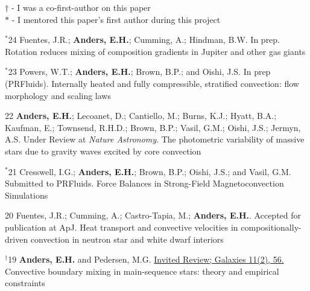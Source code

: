 {}
\hspace{\smallsephintwidth}$\dagger$ - I was a co-first-author on this paper \\
\hspace{\smallsephintwidth}$*$ - I mentored this paper's first author during this project
\vspace{0.3cm}



      {$^*$24}
      { Fuentes, J.R.; \textbf{Anders, E.H.}; Cumming, A.; Hindman, B.W. In prep.
      }
      {Rotation reduces mixing of composition gradients in Jupiter and other gas giants}

\cvpub{}
      {$^*$23}
      {
        Powers, W.T.; \textbf{Anders, E.H.}; Brown, B.P.; and Oishi, J.S.
        In prep (PRFluids).\hspace{-0.5cm}
      }
      {Internally heated and fully compressible, stratified convection: flow morphology and scaling laws}

\cvpub{}
      {22}
      {
        \textbf{Anders, E.H.}; Lecoanet, D.; Cantiello, M.; Burns, K.J.; Hyatt, B.A.; Kaufman, E.; Townsend, R.H.D.; Brown, B.P.; Vasil, G.M.; Oishi, J.S.; Jermyn, A.S. Under Review at \textit{Nature Astronomy}.     
      }
      {The photometric variability of massive stars due to gravity waves excited by core convection}

\cvpub{}
      {$^*$21}
      {
        Cresswell, I.G.; \textbf{Anders, E.H.}; Brown, B.P.; Oishi, J.S.; and Vasil, G.M.
        Submitted to PRFluids. 
      }
      {Force Balances in Strong-Field Magnetoconvection Simulations}

\cvpub{}
      {20}
      {
        Fuentes, J.R.; Cumming, A.; Castro-Tapia, M.; \textbf{Anders, E.H.}. Accepted for publication at ApJ.
      }
      {Heat transport and convective velocities in compositionally-driven convection in neutron star and white dwarf interiors}

\cvpub{}
      {$^{\dagger}$19}
      {
        \textbf{Anders, E.H.} and Pedersen, M.G. 
        \href{https://www.mdpi.com/2075-4434/11/2/56}{Invited Review; Galaxies 11(2), 56.}
      }
      {Convective boundary mixing in main-sequence stars: theory and empirical constraints}




